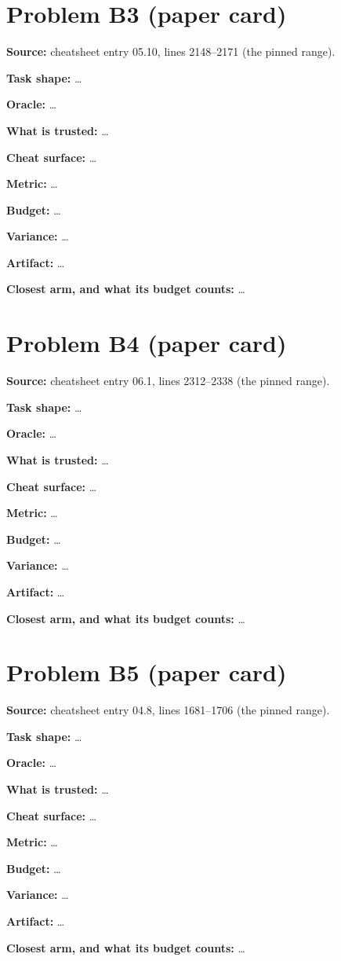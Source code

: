 \documentclass[11pt]{article}
\begin{document}
\section*{Problem B3 (paper card)}\label{ans:B3}
\begin{answer}
\textbf{Source:} cheatsheet entry 05.10, lines 2148--2171 (the pinned range).

\textbf{Task shape:} \dots

\textbf{Oracle:} \dots

\textbf{What is trusted:} \dots

\textbf{Cheat surface:} \dots

\textbf{Metric:} \dots

\textbf{Budget:} \dots

\textbf{Variance:} \dots

\textbf{Artifact:} \dots

\textbf{Closest arm, and what its budget counts:} \dots
\end{answer}

\section*{Problem B4 (paper card)}\label{ans:B4}
\begin{answer}
\textbf{Source:} cheatsheet entry 06.1, lines 2312--2338 (the pinned range).

\textbf{Task shape:} \dots

\textbf{Oracle:} \dots

\textbf{What is trusted:} \dots

\textbf{Cheat surface:} \dots

\textbf{Metric:} \dots

\textbf{Budget:} \dots

\textbf{Variance:} \dots

\textbf{Artifact:} \dots

\textbf{Closest arm, and what its budget counts:} \dots
\end{answer}

\section*{Problem B5 (paper card)}\label{ans:B5}
\begin{answer}
\textbf{Source:} cheatsheet entry 04.8, lines 1681--1706 (the pinned range).

\textbf{Task shape:} \dots

\textbf{Oracle:} \dots

\textbf{What is trusted:} \dots

\textbf{Cheat surface:} \dots

\textbf{Metric:} \dots

\textbf{Budget:} \dots

\textbf{Variance:} \dots

\textbf{Artifact:} \dots

\textbf{Closest arm, and what its budget counts:} \dots
\end{answer}
\end{document}
